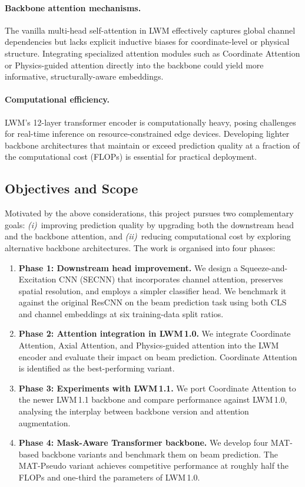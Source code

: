 \documentclass[12pt,a4paper]{article}
\begin{document}
\paragraph{Backbone attention mechanisms.}
The vanilla multi-head self-attention in LWM effectively captures global channel dependencies but lacks explicit inductive biases for coordinate-level or physical structure. Integrating specialized attention modules such as Coordinate Attention or Physics-guided attention directly into the backbone could yield more informative, structurally-aware embeddings.

\paragraph{Computational efficiency.}
LWM's 12-layer transformer encoder is computationally heavy, posing challenges for real-time inference on resource-constrained edge devices. Developing lighter backbone architectures that maintain or exceed prediction quality at a fraction of the computational cost (FLOPs) is essential for practical deployment.

\subsection{Objectives and Scope}

Motivated by the above considerations, this project pursues two complementary goals: \emph{(i)}~improving prediction quality by upgrading both the downstream head and the backbone attention, and \emph{(ii)}~reducing computational cost by exploring alternative backbone architectures.  The work is organised into four phases:

\begin{enumerate}
  \item \textbf{Phase 1: Downstream head improvement.}  We design a Squeeze-and-Excitation CNN (SECNN) that incorporates channel attention, preserves spatial resolution, and employs a simpler classifier head.  We benchmark it against the original ResCNN on the beam prediction task using both CLS and channel embeddings at six training-data split ratios.

  \item \textbf{Phase 2: Attention integration in LWM\,1.0.}  We integrate Coordinate Attention, Axial Attention, and Physics-guided attention into the LWM encoder and evaluate their impact on beam prediction.  Coordinate Attention is identified as the best-performing variant.

  \item \textbf{Phase 3: Experiments with LWM\,1.1.}  We port Coordinate Attention to the newer LWM\,1.1 backbone and compare performance against LWM\,1.0, analysing the interplay between backbone version and attention augmentation.

  \item \textbf{Phase 4: Mask-Aware Transformer backbone.}  We develop four MAT-based backbone variants and benchmark them on beam prediction.  The MAT-Pseudo variant achieves competitive performance at roughly half the FLOPs and one-third the parameters of LWM\,1.0.
\end{enumerate}
\end{document}
